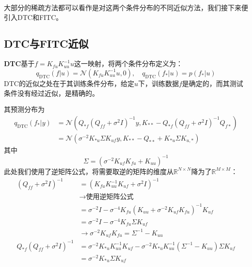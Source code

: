 大部分的稀疏方法都可以看作是对这两个条件分布的不同近似方法，我们接下来便引入DTC和FITC。

\subsection{DTC与FITC近似}

\textbf{DTC}\cite{csato2002sparse}基于$f = K_{fu} K_{uu}^{-1} u$这一映射，将两个条件分布定义为：
\begin{equation}
    q_{\mathrm{DTC}}(f|u)=\mathcal{N}(K_{fu}K_{uu}^{-1}{u},0),
    \quad q_{\mathrm{DTC}}({f_{*}}|{u})=p({f_{*}}|{u})
\end{equation}
DTC的近似之处在于其训练条件分布，给定$u$下，训练数据$f$是确定的，而其测试条件没有经过近似，是精确的。

其预测分布为
\begin{equation} \label{equ:DTC_pred}
    \begin{aligned}
    q_{\text{DTC}}(f_* | y) &= \mathcal N \left (
        Q_{*f} (Q_{ff} + \sigma^2 I)^{-1} y,
        K_{**} - Q_{*f} (Q_{ff} + \sigma^2 I)^{-1} Q_{f*}
        \right ) \\
        &= \mathcal N \left (
            \sigma^{-2} K_{*u} \Sigma K_{uf} y,
            K_{**} - Q_{**} + K_{*u} \Sigma K_{u, *}
            \right )
    \end{aligned}
\end{equation}
其中
\begin{equation}
    \Sigma = (\sigma^{-2} K_{uf} K_{fu} + K_{uu})^{-1}
\end{equation}
此处我们使用了逆矩阵公式，将需要取逆的矩阵的维度从$\mathbb R^{N \times N}$降为了$\mathbb R^{M \times M}$：
\begin{equation}
    \begin{aligned}
        (Q_{ff} + \sigma^2 I)^{-1} 
        &= (K_{{fu}} K_{{uu}}^{-1} K_{{uf}} + \sigma^2 I)^{-1} \\
        &\rightarrow \text{使用逆矩阵公式} \\
        &= \sigma^{-2} I - \sigma^{-4} K_{{fu}} (K_{{uu}} + \sigma^{-2} K_{{uf}} K_{{fu}})^{-1} K_{{uf}} \\
        &= \sigma^{-2} I - \sigma^{-4} K_{{fu}} \Sigma K_{{uf}} \\
        &\rightarrow \sigma^{-2} K_{{uf}} K_{{fu}} = \Sigma^{-1} - K_{{uu}} \\
        Q_{*f} (Q_{ff} + \sigma^2 I)^{-1}
        &= \sigma^{-2} K_{{*u}} K_{{uu}}^{-1} K_{{uf}} - \sigma^{-2} K_{{*u}} K_{{uu}}^{-1} (\Sigma^{-1} - K_{{uu}}) \Sigma K_{{uf}} \\
        &= \sigma^{-2} K_{{*u}} \Sigma K_{{uf}}
    \end{aligned}
\end{equation}

